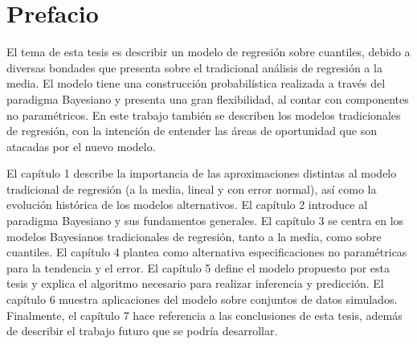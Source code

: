 \pagestyle{plain}
\chapter*{Prefacio}


El tema de esta tesis es describir un modelo de regresi\'on sobre cuantiles, debido a diversas bondades que presenta sobre el tradicional an\'alisis de regresi\'on a la media. El modelo tiene una construcci\'on probabil\'istica realizada a través del paradigma Bayesiano y presenta una gran flexibilidad, al contar con componentes no param\'etricos. En este trabajo tambi\'en se describen los modelos tradicionales de regresi\'on, con la intenci\'on de entender las \'areas de oportunidad que son atacadas por el nuevo modelo.

El cap\'itulo 1 describe la importancia de las aproximaciones distintas al modelo tradicional de regresi\'on (a la media, lineal y con error normal), así como la evoluci\'on hist\'orica de los modelos alternativos. El cap\'itulo 2 introduce al paradigma Bayesiano y sus fundamentos generales. El cap\'itulo 3 se centra en los modelos Bayesianos tradicionales de regresi\'on, tanto a la media, como sobre cuantiles. El cap\'itulo 4 plantea como alternativa especificaciones no param\'etricas para la tendencia y el error. El cap\'itulo 5 define el modelo propuesto por esta tesis y explica el algoritmo necesario para realizar inferencia y predicci\'on. El cap\'itulo 6 muestra aplicaciones del modelo sobre conjuntos de datos simulados. Finalmente, el cap\'itulo 7 hace referencia a las conclusiones de esta tesis, adem\'as de describir el trabajo futuro que se podr\'ia desarrollar.